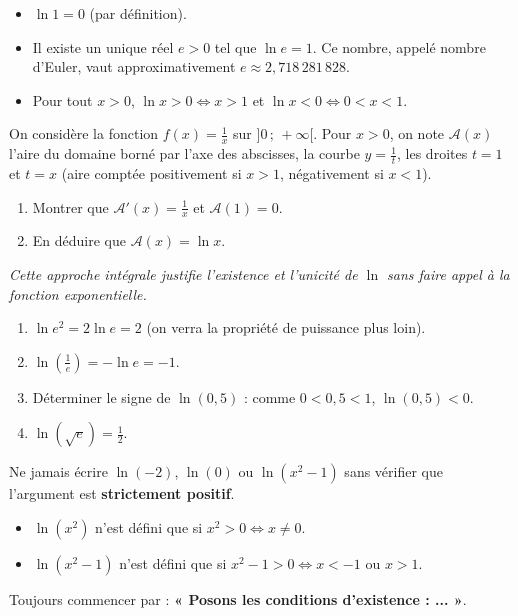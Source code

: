 \documentclass[11pt]{article}
\newcommand{\cle}[1]{{\popxbold\color{popdark}#1}}
\begin{document}
\begin{propriete}
\begin{itemize}
  \item $\ln 1 = 0$ (par définition).
  \item Il existe un unique réel $e > 0$ tel que $\ln e = 1$. Ce nombre, appelé \cle{nombre d'Euler}, vaut approximativement $e \approx 2{,}718\,281\,828$.
  \item Pour tout $x > 0$, $\ln x > 0 \Leftrightarrow x > 1$ et $\ln x < 0 \Leftrightarrow 0 < x < 1$.
\end{itemize}
\end{propriete}

\begin{experience}
On considère la fonction $f(x) = \frac{1}{x}$ sur $]0\,;\,+\infty[$. Pour $x > 0$, on note $\mathcal{A}(x)$ l'aire du domaine borné par l'axe des abscisses, la courbe $y = \frac{1}{t}$, les droites $t=1$ et $t=x$ (aire comptée positivement si $x>1$, négativement si $x<1$).
\begin{enumerate}
  \item Montrer que $\mathcal{A}'(x) = \frac{1}{x}$ et $\mathcal{A}(1)=0$.
  \item En déduire que $\mathcal{A}(x) = \ln x$.
\end{enumerate}
\emph{Cette approche intégrale justifie l'existence et l'unicité de $\ln$ sans faire appel à la fonction exponentielle.}
\end{experience}

\begin{exemplebox}
\begin{enumerate}
  \item $\ln e^2 = 2\ln e = 2$ (on verra la propriété de puissance plus loin).
  \item $\ln(\frac{1}{e}) = -\ln e = -1$.
  \item Déterminer le signe de $\ln(0{,}5)$ : comme $0 < 0{,}5 < 1$, $\ln(0{,}5) < 0$.
  \item $\ln(\sqrt{e}) = \frac{1}{2}$.
\end{enumerate}
\end{exemplebox}

\begin{attention}
Ne jamais écrire $\ln(-2)$, $\ln(0)$ ou $\ln(x^2-1)$ sans vérifier que l'argument est \textbf{strictement positif}.
\begin{itemize}
  \item $\ln(x^2)$ n'est défini que si $x^2 > 0 \Leftrightarrow x \neq 0$.
  \item $\ln(x^2-1)$ n'est défini que si $x^2-1 > 0 \Leftrightarrow x < -1$ ou $x > 1$.
\end{itemize}
Toujours commencer par : \textbf{« Posons les conditions d'existence : ... »}.
\end{attention}
\end{document}
